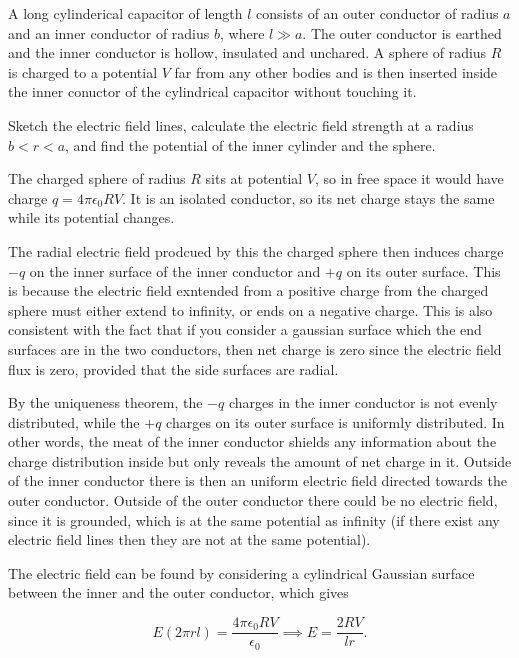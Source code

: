 \documentclass[english,a4paper,12pt]{report}
\begin{document}
{A long cylinderical capacitor of length \(l\) consists of an outer conductor of radius \(a\) and an inner conductor of radius \(b\), where \(l \gg a\). The outer conductor is earthed and the inner conductor is hollow, insulated and unchared. A sphere of radius \(R\) is charged to a potential \(V\) far from any other bodies and is then inserted inside the inner conuctor of the cylindrical capacitor without touching it. 

Sketch the electric field lines, calculate the electric field strength at a radius \(b<r<a\), and find the potential of the inner cylinder and the sphere.}
{The charged sphere of radius \(R\) sits at potential \(V\), so in free space it would have charge \(q = 4\pi \epsilon_0 RV\). It is an isolated conductor, so its net charge stays the same while its potential changes.

The radial electric field prodcued by this the charged sphere then induces charge \(-q\) on the inner surface of the inner conductor and \(+q\) on its outer surface. This is because the electric field exntended from a positive charge from the charged sphere must either extend to infinity, or ends on a negative charge. This is also consistent with the fact that if you consider a gaussian surface which the end surfaces are in the two conductors, then net charge is zero since the electric field flux is zero, provided that the side surfaces are radial.

By the uniqueness theorem, the \(-q\) charges in the inner conductor is not evenly distributed, while the \(+q\) charges on its outer surface is uniformly distributed. In other words, the meat of the inner conductor shields any information about the charge distribution inside but only reveals the amount of net charge in it. Outside of the inner conductor there is then an uniform electric field directed towards the outer conductor. Outside of the outer conductor there could be no electric field, since it is grounded, which is at the same potential as infinity (if there exist any electric field lines then they are not at the same potential).

The electric field can be found by considering a cylindrical Gaussian surface between the inner and the outer conductor, which gives

\begin{equation}
    E(2\pi rl) = \frac{4\pi \epsilon_0 RV}{\epsilon_0 } \implies E = \frac{2RV}{lr}.  
\end{equation}

}
\end{document}

